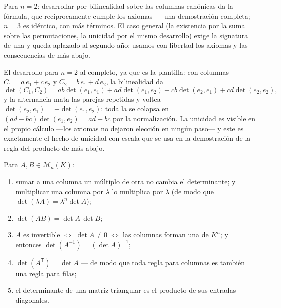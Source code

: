 \begin{remark}
Para $n = 2$: desarrollar por bilinealidad sobre las columnas
canónicas da la fórmula, que recíprocamente cumple los axiomas ---
una demostración completa; $n = 3$ es idéntico, con más términos. El
caso general (la existencia por la suma sobre las permutaciones, la
unicidad por el mismo desarrollo) exige la signatura de una
 y queda aplazado al segundo año; usamos con libertad los
axiomas y las consecuencias de más abajo.

El desarrollo para $n = 2$ al completo, ya que es la plantilla: con
columnas $C_1 = a\,e_1 + c\,e_2$ y $C_2 = b\,e_1 + d\,e_2$, la
bilinealidad da
\[
\det(C_1, C_2) = ab\det(e_1, e_1) + ad\det(e_1, e_2)
+ cb\det(e_2, e_1) + cd\det(e_2, e_2),
\]
y la alternancia mata las parejas repetidas y voltea
$\det(e_2, e_1) = -\det(e_1, e_2)$: toda la  se colapsa en
$(ad - bc)\det(e_1, e_2) = ad - bc$ por la normalización. La unicidad
es visible en el propio cálculo ---los axiomas no dejaron elección en
ningún paso--- y este es exactamente el hecho de unicidad con escala
que se usa en la demostración de la regla del producto de más abajo.
\end{remark}

\begin{theorem}[Propiedades]\label{thm:b1:det:props}
Para $A, B \in \mathcal{M}_n(K)$:
\begin{enumerate}
  \item sumar a una columna un múltiplo de otra no cambia el
        determinante; y multiplicar una columna por $\lambda$ lo
        multiplica por $\lambda$ (de modo que
        $\det(\lambda A) = \lambda^n \det A$);
  \item $\det(AB) = \det A\, \det B$;
  \item $A$ es invertible $\iff$ $\det A \neq 0$ $\iff$ las columnas
        forman una  de $K^n$; y entonces
        $\det(A^{-1}) = (\det A)^{-1}$;
  \item $\det(A^{\mathsf T}) = \det A$ --- de modo que toda regla
        para columnas es también una regla para filas;
  \item el determinante de una matriz triangular es el producto de
        sus entradas diagonales.
\end{enumerate}
\end{theorem}

